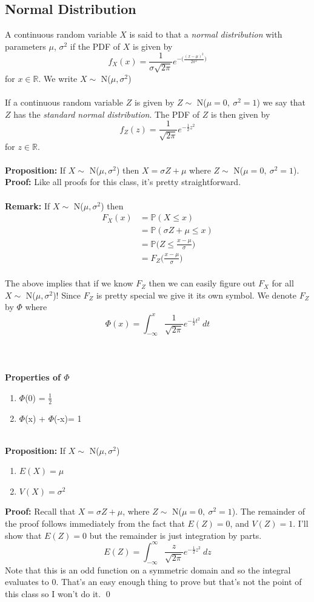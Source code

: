 \documentclass{article}
\newcommand{\ti}[1]{\textit{#1}}
\newcommand{\R}{\mathbb{R}}
\newcommand{\bbP}{\mathbb{P}}
\begin{document}
\subsection{Normal Distribution}
A continuous random variable $X$ is said to that a \ti{normal distribution} with parameters $\mu$, $\sigma^{2}$ if the PDF of $X$ is given by
\[f_{X}(x) = \frac{1}{\sigma\sqrt{2\pi}}e^{-\big(\frac{(x-\mu)^{2}}{2\pi^{2}}\big)}\]
for $x \in \R$. We write $X \sim$ N($\mu, \sigma^{2}$)\\\\
If a continuous random variable $Z$ is given by $Z \sim$ N($\mu=0,\ \sigma^2=1$) we say that $Z$ has the \ti{standard normal distribution}. The PDF of $Z$ is then given by
\[f_{Z}(z) = \frac{1}{\sqrt{2\pi}}e^{-\frac{1}{2}z^{2}}\]
for $z \in \R$.\\\\
\textbf{Proposition:} If $X \sim$ N($\mu, \sigma^{2}$) then $X = \sigma Z + \mu$ where $Z \sim$ N($\mu=0,\ \sigma^2=1$).
\textbf{Proof:} Like all proofs for this class, it's pretty straightforward.\\\\
\textbf{Remark:} If $X \sim$ N($\mu, \sigma^{2}$) then
\begin{align*}
	F_{X}(x) &= \bbP(X \leq x)\\
			&= \bbP(\sigma Z + \mu \leq x)\\
			&= \bbP\bigg(Z \leq \frac{x-\mu}{\sigma}\bigg)\\
			&= F_{Z}\bigg(\frac{x-\mu}{\sigma}\bigg)
\end{align*}
\ \\
The above implies that if we know $F_{Z}$ then we can easily figure out $F_{X}$ for all $X \sim$ N($\mu, \sigma^{2}$)! Since $F_{Z}$ is pretty special we give it its own symbol. We denote $F_Z$ by $\Phi$ where
\[\Phi(x) = \int_{-\infty}^{x} \frac{1}{\sqrt{2\pi}}e^{-\frac{1}{2}t^{2}}\ dt\]\\\\\\
\textbf{Properties of $\Phi$}
\begin{enumerate}
	\item $\Phi$(0) = $\frac{1}{2}$
	\item $\Phi$(x) + $\Phi$(-x)= 1
\end{enumerate}
\ \\
\textbf{Proposition:} If $X \sim$ N($\mu, \sigma^{2}$)
\begin{enumerate}
	\item $E(X) = \mu$
	\item $V(X) = \sigma^{2}$
\end{enumerate}
\textbf{Proof:} Recall that $X = \sigma Z + \mu$, where $Z \sim$ N($\mu=0,\ \sigma^{2}=1$). The remainder of the proof follows immediately from the fact that $E(Z) = 0$, and $V(Z)=1$. I'll show that $E(Z) =0$ but the remainder is just integration by parts.
\[E(Z) = \int_{-\infty}^{\infty} \frac{z}{\sqrt{2\pi}}e^{-\frac{1}{2}z^{2}}\ dz\]
Note that this is an odd function on a symmetric domain and so the integral evaluates to 0. That's an easy enough thing to prove but that's not the point of this class so I won't do it.
\qed
\newpage
\end{document}
